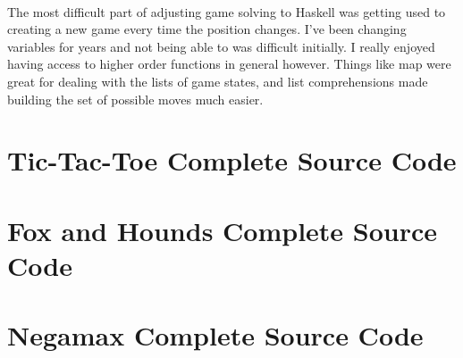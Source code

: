 \documentclass[10pt]{article}
\begin{document}
\paragraph{} The most difficult part of adjusting game solving to Haskell was 
getting used to creating a new game every time the position changes.  I've 
been changing variables for years and not being able to was difficult initially.
I really enjoyed having access to higher order functions in general however.  
Things like map were great for dealing with the lists of game states, and list
comprehensions made building the set of possible moves much easier.

\clearpage
\nocite{*}



\begin{appendices}
\clearpage
\section{Tic-Tac-Toe Complete Source Code}


\newpage
\section{Fox and Hounds Complete Source Code}


\newpage
\section{Negamax Complete Source Code}


\end{appendices}
\end{document}
